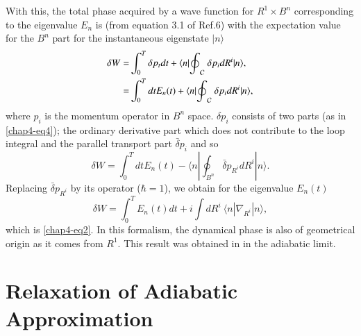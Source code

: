 With this, the total phase acquired by a wave function for $R^1\times B^n$ corresponding to the eigenvalue  $E_n$ is (from equation 3.1 of Ref.6) with the expectation value for the $B^n$ part for the instantaneous   eigenstate $|n\rangle $ 
\begin{align}
\delta W= &\int_0^T \delta p_t dt+\langle n|{\oint}_{\cal{C}}\ \delta p_i dR^i|n\rangle , \nonumber \\
= &\int_0^T dt E_n(t)+\langle n|{\oint}_{\cal{C}}\ \delta p_i dR^i|n\rangle,\label{chap4-eq6}
\end{align}
where $p_i$ is the momentum operator in $B^n$ space. $\delta p_i$ consists of two parts (as in \eqref{chap4-eq4}); the ordinary  derivative part which does not contribute to the loop integral and the parallel transport part $\bar{\delta}p_i$    and so 
\begin{equation}
\delta W= \int_0^Tdt E_n(t)-\langle n|{\oint}_{B^n}{\bar{\delta}}p_{R^i} dR^i|n\rangle.\label{chap4-eq7}
\end{equation}
Replacing ${\bar{\delta}}p_{R^i}$ by its operator ($\hbar=1$), we obtain for the eigenvalue $E_n(t)$
\begin{equation}
\delta W= \int_0^T E_n(t)dt+i\int dR^i\ \langle n|{\nabla}_{R^i}|n\rangle, \label{chap4-eq8}
\end{equation}
which is \eqref{chap4-eq2}. In this formalism, the dynamical phase is also of geometrical origin as it comes from $R^1$. This  result was obtained in \cite{key7} in the adiabatic limit. 

\section{Relaxation of Adiabatic Approximation}\label{chap4-sec4}

